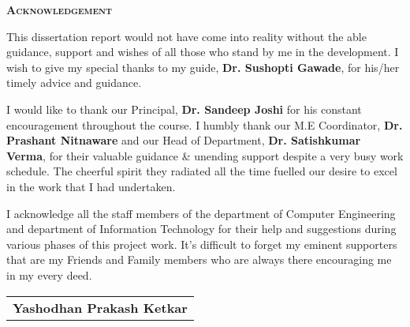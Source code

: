 {\centering \bf \LARGE \scshape
Acknowledgement \\
}

\vspace{1em} \noindent
This dissertation report would not have come into reality without the able guidance, support and wishes of all those who stand by me in the  development. I wish to give my special thanks to my guide, \textbf{Dr. Sushopti Gawade}, for his/her timely advice and guidance.

\noindent
I would like to thank our Principal, \textbf{Dr. Sandeep Joshi} for his constant encouragement throughout the course. I humbly thank our M.E Coordinator, \textbf{Dr. Prashant Nitnaware} and our Head of Department, \textbf{Dr. Satishkumar Verma}, for their valuable guidance \& unending support despite a very busy work schedule. The cheerful spirit they radiated all the time fuelled our desire to excel in the work that I had undertaken.

\noindent
I acknowledge all the staff members of the department of Computer Engineering and department of Information Technology for their help and suggestions during various phases of this project work. It's difficult to forget my eminent supporters that are my Friends and Family members who are always there encouraging me in my every deed.




\vspace{7.5em}
\begin{flushright}
  \begin{tabular}{c}
    \textbf{Yashodhan Prakash Ketkar} \\
  \end{tabular}
\end{flushright}